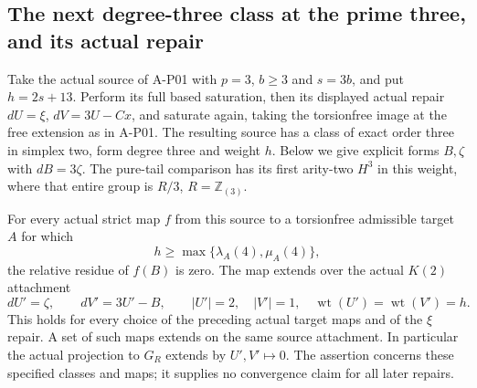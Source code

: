 \subsection{The next degree-three class at the prime three, and its actual repair}

\begin{theorem}
\label{AL20}
Take the actual source of A-P01 with $p=3$, $b\geq3$ and
$s=3b$, and put $h=2s+13$.
Perform its full based saturation, then its displayed actual
repair $dU=\xi$, $dV=3U-Cx$, and saturate again, taking the
torsionfree image at the free extension as in A-P01.
The resulting source has a class of exact order three in
simplex two, form degree three and weight $h$.
Below we give explicit forms $B,\zeta$ with $dB=3\zeta$.
The pure-tail comparison has its first arity-two $H^3$ in
this weight, where that entire group is $R/3$, $R=\mathbb Z_{(3)}$.

For every actual strict map $f$ from this source to a
torsionfree admissible target $A$ for which
\[
             h\geq\max\{\lambda_A(4),\mu_A(4)\},
 \tag{AL.106}
\]
the relative residue of $f(B)$ is zero. The map extends
over the actual $K(2)$ attachment
\[
       dU'=\zeta,\qquad dV'=3U'-B,
       \qquad |U'|=2,\quad |V'|=1,\quad
       \operatorname{wt}(U')=\operatorname{wt}(V')=h.
 \tag{AL.107}
\]
This holds for every choice of the preceding actual target
maps and of the $\xi$ repair. A set of such maps extends
on the same source attachment. In particular the actual
projection to $G_R$ extends by $U',V'\mapsto0$.
The assertion concerns these specified classes and maps;
it supplies no convergence claim for all later repairs.
\end{theorem}

